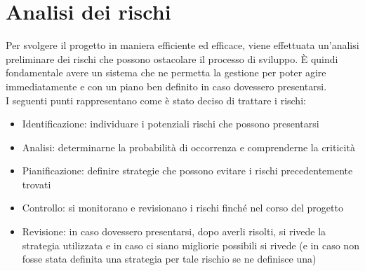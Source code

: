 
\newpage
\section{Analisi dei rischi} \label{AnalisiDeiRischi}
	Per svolgere il progetto in maniera efficiente ed efficace, viene effettuata un'analisi preliminare dei rischi che possono ostacolare il processo di sviluppo.
	È quindi fondamentale avere un sistema che ne permetta la gestione per poter agire immediatamente e con un piano ben definito in caso dovessero presentarsi.\\
	I seguenti punti rappresentano come è stato deciso di trattare i rischi:
	\begin{itemize}
		\item Identificazione: individuare i potenziali rischi che possono presentarsi
		\item Analisi: determinarne la probabilità di occorrenza e comprenderne la criticità
		\item Pianificazione: definire strategie che possono evitare i rischi precedentemente trovati
		\item Controllo: si monitorano e revisionano i rischi finché nel corso del progetto
		\item Revisione: in caso dovessero presentarsi, dopo averli risolti, si rivede la strategia utilizzata e in caso ci siano migliorie possibili si rivede (e in caso non fosse stata definita una strategia per tale rischio se ne definisce una)
	\end{itemize}
